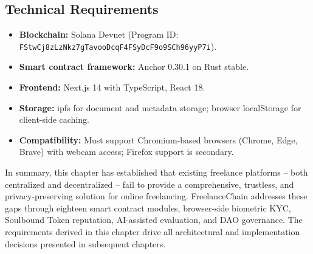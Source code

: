 \subsection{Technical Requirements}

\begin{itemize}
    \item \textbf{Blockchain:} Solana Devnet (Program ID: \texttt{FStwCj8zLzNkz7gTavooDcqF4FSyDcF9o9SCh96yyP7i}).
    \item \textbf{Smart contract framework:} Anchor 0.30.1 on Rust stable.
    \item \textbf{Frontend:} Next.js 14 with TypeScript, React 18.
    \item \textbf{Storage:} \gls{ipfs} for document and metadata storage; browser localStorage for client-side caching.
    \item \textbf{Compatibility:} Must support Chromium-based browsers (Chrome, Edge, Brave) with webcam access; Firefox support is secondary.
\end{itemize}

In summary, this chapter has established that existing freelance platforms -- both centralized and decentralized -- fail to provide a comprehensive, trustless, and privacy-preserving solution for online freelancing. FreelanceChain addresses these gaps through eighteen smart contract modules, browser-side biometric KYC, Soulbound Token reputation, AI-assisted evaluation, and DAO governance. The requirements derived in this chapter drive all architectural and implementation decisions presented in subsequent chapters.
